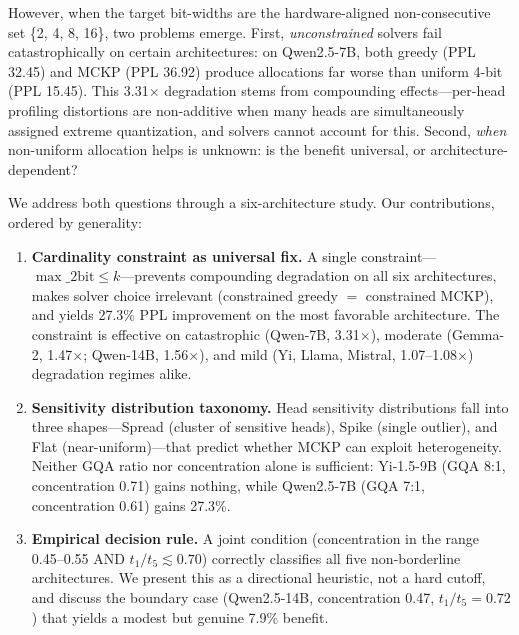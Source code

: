 \documentclass[11pt,a4paper]{article}
\newcommand{\tratio}{\ensuremath{t_1/t_5}}
\begin{document}
However, when the target bit-widths are the hardware-aligned non-consecutive set \{2, 4, 8, 16\}, two problems emerge.
First, \emph{unconstrained} solvers fail catastrophically on certain architectures: on Qwen2.5-7B, both greedy (PPL 32.45) and MCKP (PPL 36.92) produce allocations far worse than uniform 4-bit (PPL 15.45).
This 3.31$\times$ degradation stems from compounding effects---per-head profiling distortions are non-additive when many heads are simultaneously assigned extreme quantization, and solvers cannot account for this.
Second, \emph{when} non-uniform allocation helps is unknown: is the benefit universal, or architecture-dependent?

We address both questions through a six-architecture study.
Our contributions, ordered by generality:

\begin{enumerate}
    \item \textbf{Cardinality constraint as universal fix.}
    A single constraint---$\max\_2\text{bit} \le k$---prevents compounding degradation on all six architectures, makes solver choice irrelevant (constrained greedy $=$ constrained MCKP), and yields 27.3\% PPL improvement on the most favorable architecture.
    The constraint is effective on catastrophic (Qwen-7B, 3.31$\times$), moderate (Gemma-2, 1.47$\times$; Qwen-14B, 1.56$\times$), and mild (Yi, Llama, Mistral, 1.07--1.08$\times$) degradation regimes alike.

    \item \textbf{Sensitivity distribution taxonomy.}
    Head sensitivity distributions fall into three shapes---Spread (cluster of sensitive heads), Spike (single outlier), and Flat (near-uniform)---that predict whether MCKP can exploit heterogeneity.
    Neither GQA ratio nor concentration alone is sufficient: Yi-1.5-9B (GQA 8:1, concentration 0.71) gains nothing, while Qwen2.5-7B (GQA 7:1, concentration 0.61) gains 27.3\%.

    \item \textbf{Empirical decision rule.}
    A joint condition (concentration in the range 0.45--0.55 AND $\tratio \lesssim 0.70$) correctly classifies all five non-borderline architectures.
    We present this as a directional heuristic, not a hard cutoff, and discuss the boundary case (Qwen2.5-14B, concentration 0.47, $\tratio = 0.72$) that yields a modest but genuine 7.9\% benefit.
\end{enumerate}

\end{document}
